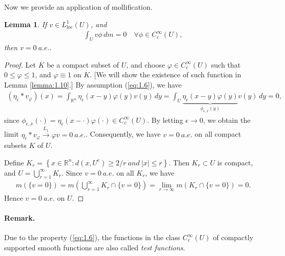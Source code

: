 \documentclass{article}
\numberwithin{equation}{section}
\newcommand{\bbR}{\mathbb{R}}
\newcommand{\loc}{\mathrm{loc}}
\theoremstyle{plain}
\newtheorem{lemma}[theorem]{Lemma}
\theoremstyle{definition}
\begin{document}
Now we provide an application of mollification.
\begin{lemma}\label{lemma:1.9}
If $v\in L^1_\loc(U)$, and
\begin{align}
	\int_U v\phi\,dm=0\quad\forall \phi\in C_c^\infty(U),\label{eq:1.5}
\end{align}
then $v=0\ a.e.$.
\end{lemma}
\begin{proof}
Let $K$ be a compact subset of $U$, and choose $\varphi\in C_c^\infty(U)$ such that $0\leq\varphi\leq 1$, and $\varphi\equiv 1$ on $K$. [We will show the existence of such function in Lemma \ref{lemma:1.10}.] By assumption (\ref{eq:1.6}), we have
\begin{align*}
	(\eta_\epsilon *v_\varphi)(x)=\int_{\bbR^n}\eta_\epsilon(x-y)\varphi(y)v(y)\,dy=\int_U\underbrace{\eta_\epsilon(x-y)\varphi(y)}_{\phi_{\epsilon,x}(y)}v(y)\,dy=0,
\end{align*}
since $\phi_{\epsilon,x}(\cdot)=\eta_\epsilon(x-\cdot)\varphi(\cdot)\in C_c^\infty(U)$. By letting $\epsilon\to 0$, we obtain the limit $\eta_\epsilon *v_\varphi\overset{L_1}{\to}\varphi v=0\ a.e.$. Consequently, we have $v=0\ a.e.$ on all compact subsets $K$ of $U$.

Define $K_r=\left\{x\in\bbR^n:d(x,U^c)\geq 2/r\ and\ \vert x\vert\leq r\right\}$. Then $K_r\subset U$ is compact, and $U=\bigcup_{r=1}^\infty K_r$. Since $v=0\ a.e.$ on all $K_r$, we have
\begin{align*}
	m(\{v=0\})=m\left(\bigcup_{r=1}^\infty K_r\cap\{v=0\}\right)=\lim_{r\to\infty}m(K_r\cap\{v=0\})=0.
\end{align*}
Hence $v=0\ a.e.$ on $U$.
\end{proof}
\paragraph{Remark.} Due to the property (\ref{eq:1.6}), the functions in the class $C_c^\infty(U)$ of compactly supported smooth functions are also called \textit{test functions}.
\end{document}
